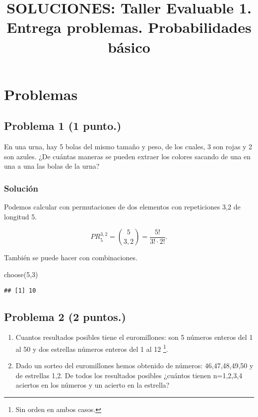 \documentclass[
]{article}
\title{SOLUCIONES: Taller Evaluable 1. Entrega problemas. Probabilidades
básico}
\author{}
\date{\vspace{-2.5em}}
\newenvironment{Shaded}{\begin{snugshade}}{\end{snugshade}}
\newcommand{\DecValTok}[1]{\textcolor[rgb]{0.00,0.00,0.81}{#1}}
\newcommand{\FunctionTok}[1]{\textcolor[rgb]{0.00,0.00,0.00}{#1}}
\newcommand{\NormalTok}[1]{#1}
\begin{document}
\maketitle

\hypertarget{problemas}{%
\section{Problemas}\label{problemas}}

\hypertarget{problema-1}{%
\subsection{\texorpdfstring{Problema 1
(\textbf{1 punto.})}{Problema 1 ()}}\label{problema-1}}

En una urna, hay 5 bolas del mismo tamaño y peso, de los cuales, 3 son
rojas y 2 son azules. ¿De cuántas maneras se pueden extraer los colores
sacando de una en una a una las bolas de la urna?

\hypertarget{soluciuxf3n}{%
\subsubsection{Solución}\label{soluciuxf3n}}

Podemos calcular con permutaciones de dos elementos con repeticiones 3,2
de longitud 5.

\[
PR_5^{3,2}=\binom{5}{3,2}=\frac{5!}{3!\cdot 2!}.
\]

También se puede hacer con combinaciones.

\begin{Shaded}
\begin{Highlighting}[]
\FunctionTok{choose}\NormalTok{(}\DecValTok{5}\NormalTok{,}\DecValTok{3}\NormalTok{)}
\end{Highlighting}
\end{Shaded}

\begin{verbatim}
## [1] 10
\end{verbatim}

\hypertarget{problema-2}{%
\subsection{\texorpdfstring{Problema 2
(\textbf{2 puntos.})}{Problema 2 ()}}\label{problema-2}}

\begin{enumerate}
\def\labelenumi{\alph{enumi}.}
\item
  Cuantos resultados posibles tiene el euromillones: son 5 números
  enteros del 1 al 50 y dos estrellas números enteros del 1 al 12
  \footnote{Sin orden en ambos casos.}.
\item
  Dado un sorteo del euromillones hemos obtenido de números:
  46,47,48,49,50 y de estrellas 1,2. De todos los resultados posibles
  ¿cuántos tienen n=1,2,3,4 aciertos en los números y un acierto en la
  estrella?
\end{enumerate}
\end{document}
